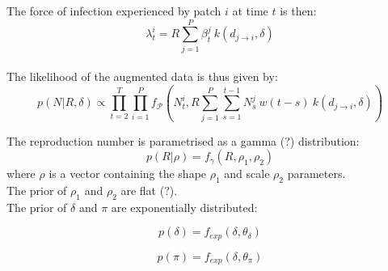 \documentclass[a4paper,11pt]{article}
\begin{document}
The force of infection experienced by patch $i$ at time $t$ is then:
\begin{equation}
\lambda_t^i = R \sum_{j=1}^P \beta_t^j \: k(d_{j\rightarrow i},\delta)
\end{equation}
\\

The likelihood of the augmented data is thus given by:
\begin{equation}
p(N|R, \delta) \propto \prod_{t=2}^T \prod_{i=1}^P 
       f_\mathcal{P}(N_t^i, R 
       \sum_{j=1}^P \sum_{s=1}^{t-1} N_s^j \:  w(t - s) \:
       k(d_{j\rightarrow i},\delta) )
\end{equation}


The reproduction number is parametrised as a gamma (?) distribution:
\begin{equation}
p(R | \rho) = f_{\gamma} (R, \rho_1, \rho_2)
\end{equation}
where $\rho$ is a vector containing the shape $\rho_1$ and scale 
$\rho_2$ parameters.
\\

The prior of $\rho_1$ and $\rho_2$ are flat (?).
\\

The prior of $\delta$ and $\pi$ are exponentially distributed:

\begin{equation}
p(\delta) = f_{exp}(\delta,  \theta_{\delta})
\end{equation}

\begin{equation}
p(\pi) = f_{exp}(\delta,  \theta_{\pi})
\end{equation}


%
%
\end{document}
